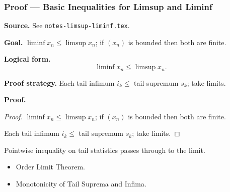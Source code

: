 
\clearpage
{}
\hypertarget{proof-RA-ABB-T-limsup-basic-ineq}{}

\subsubsection[Basic Inequalities for Limsup and Liminf]{Proof --- Basic Inequalities for Limsup and Liminf}

\bigskip

\noindent
\textbf{Source.} See \texttt{notes-limsup-liminf.tex}.

\vspace{0.75em}

\noindent
\textbf{Goal.} $\liminf x_n \le \limsup x_n$; if $(x_n)$ is bounded then both are finite.

\vspace{0.75em}

\noindent
\textbf{Logical form.}
\[
  \liminf x_n \le \limsup x_n.
\]

\vspace{0.75em}

\noindent
\textbf{Proof strategy.} Each tail infimum $i_k \le$ tail supremum $s_k$; take limits.

\vspace{0.75em}

\noindent
\textbf{Proof.}
\begin{proof}
\Claim $\liminf x_n \le \limsup x_n$; if $(x_n)$ is bounded then both are finite.

\Given 

\Goal 

\Strategy Each tail infimum $i_k \le$ tail supremum $s_k$; take limits.

\medskip


\end{proof}

\begin{remark*}
Pointwise inequality on tail statistics passes through to the limit.
\end{remark*}

\begin{remark*}[Dependencies]
\begin{itemize}
  \item Order Limit Theorem.
  \item Monotonicity of Tail Suprema and Infima.
\end{itemize}
\end{remark*}
